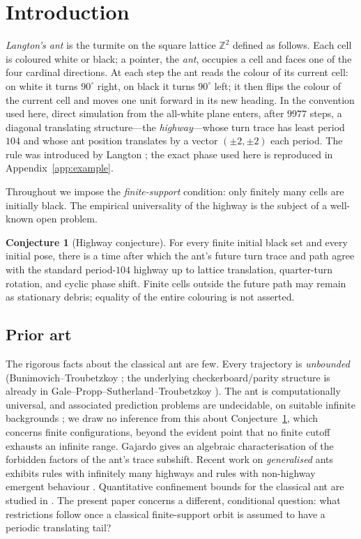 \documentclass[11pt,reqno]{amsart}
\theoremstyle{plain}
\theoremstyle{definition}
\newtheorem{conjecture}[theorem]{Conjecture}
\newcommand{\Z}{\mathbb{Z}}
\begin{document}
\section{Introduction}

\emph{Langton's ant} is the turmite on the square lattice $\Z^2$ defined as
follows. Each cell is coloured white or black; a pointer, the \emph{ant}, occupies
a cell and faces one of the four cardinal directions. At each step the ant reads
the colour of its current cell: on white it turns $90^\circ$ right, on black it
turns $90^\circ$ left; it then flips the colour of the current cell and moves one
unit forward in its new heading. In the convention used here, direct simulation from
the all-white plane enters, after $9977$ steps, a diagonal translating
structure---the \emph{highway}---whose turn trace has least period $104$ and whose
ant position translates by a vector $(\pm2,\pm2)$ each period. The rule was
introduced by Langton \cite{Langton1986}; the exact phase used here is reproduced in
Appendix~\ref{app:example}.

Throughout we impose the \emph{finite-support} condition: only finitely many cells
are initially black. The empirical universality of the highway is the subject of a
well-known open problem.

\begin{conjecture}[Highway conjecture]\label{conj:main}
For every finite initial black set and every initial pose, there is a time after which
the ant's future turn trace and path agree with the standard period-$104$ highway up
to lattice translation, quarter-turn rotation, and cyclic phase shift. Finite cells
outside the future path may remain as stationary debris; equality of the entire
colouring is not asserted.
\end{conjecture}

\subsection{Prior art}
The rigorous facts about the classical ant are few. Every trajectory is
\emph{unbounded} (Bunimovich--Troubetzkoy \cite{BunimovichTroubetzkoy1992}; the
underlying checkerboard/parity structure is already in Gale--Propp--Sutherland--Troubetzkoy
\cite{GaleProppSutnerTroubetzkoy1995}). The ant is computationally universal, and
associated prediction problems are undecidable, on suitable infinite backgrounds
\cite{GajardoMoreiraGoles2002}; we draw no inference from this about
Conjecture~\ref{conj:main}, which concerns finite configurations, beyond the evident
point that no finite cutoff exhausts an infinite range. Gajardo
\cite{Gajardo2003symbolic} gives an algebraic characterisation of the forbidden
factors of the ant's trace subshift. Recent work on \emph{generalised} ants exhibits
rules with infinitely many highways \cite{GajardoLutfallaRao2024} and rules with
non-highway emergent behaviour \cite{Lutfalla2025sideways}. Quantitative confinement
bounds for the classical ant are studied in \cite{Etse2026confined}. The present
paper concerns a different, conditional question: what restrictions follow once a
classical finite-support orbit is assumed to have a periodic translating tail?
\end{document}
